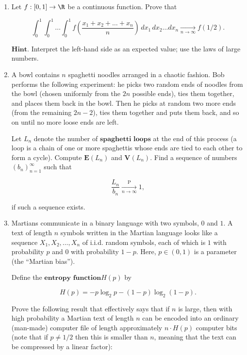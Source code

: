 \begin{enumerate}[label=\arabic*.]
\begin{enumerate}[label=(\alph*)]
\item $X\sim N(1,1)$. In this case, identify
$\mathbf{E} X^n$ combinatorially as the number of
$\textbf{involutions}$ (permutations which are
self-inverse) of a set of $n$ elements. To count the
involutions, it is a good idea to divide them into
classes according to how many fixed points they have.
(Note: the expression for $\mathbf{E}(X^n)$ may not
have a very simple form.)
\end{enumerate}

\item Let $f:[0,1]\to\R$ be a continuous function. Prove
that

\[
\int_0^1 \int_0^1 \ldots \int_0^1 f\left(\frac{x_1+x_2+\ldots+x_n}{n}\right)\,dx_1\,dx_2\ldots dx_n \xrightarrow[n\to\infty]{} f(1/2).
\]

\noindent $\textbf{Hint.}$ Interpret the left-hand side as an
expected value; use the laws of large numbers.

\item A bowl contains $n$ spaghetti noodles arranged in a
chaotic fashion. Bob performs the following
experiment: he picks two random ends of noodles from
the bowl (chosen uniformly from the $2n$ possible
ends), ties them together, and places them back in the
bowl. Then he picks at random two more ends (from the
remaining $2n-2$), ties them together and puts them
back, and so on until no more loose ends are left.

Let $L_n$ denote the number of
$\textbf{spaghetti loops}$ at the end of this process
(a loop is a chain of one or more spaghettis whose
ends are tied to each other to form a cycle). Compute
$\mathbf{E}(L_n)$ and $\mathbf{V}(L_n)$. Find a
sequence of numbers $(b_n)_{n=1}^\infty$ such that

\[
\frac{L_n}{b_n} \xrightarrow[n\to\infty]{\mathrm{P}} 1,
\]

\noindent if such a sequence exists.

\item Martians communicate in a binary language with two
symbols, $0$ and $1$. A text of length $n$ symbols
written in the Martian language looks like a sequence
$X_1, X_2, \ldots, X_n$ of i.i.d. random symbols,
each of which is $1$ with probability $p$ and $0$
with probability $1-p$. Here, $p\in(0,1)$ is a
parameter (the ``Martian bias'').

Define the $\textbf{entropy function}$$H(p)$ by

\[
H(p) = -p\log_2 p -(1-p)\log_2 (1-p).
\]

\noindent Prove the following result that effectively says that
if $n$ is large, then with high probability a Martian
text of length $n$ can be encoded into an ordinary
(man-made) computer file of length approximately
$n\cdot H(p)$ computer bits (note that if $p\neq 1/2$
then this is smaller than $n$, meaning that the text
can be compressed by a linear factor):


\end{enumerate}

